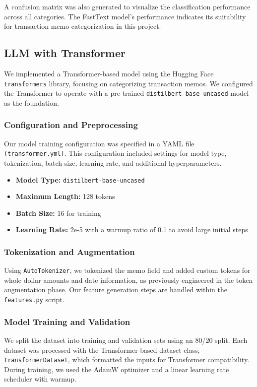 \documentclass[12pt,letterpaper]{article}
\begin{document}
A confusion matrix was also generated to visualize the classification performance across all categories. The FastText model's performance indicates its suitability for transaction memo categorization in this project.

\subsection{LLM with Transformer}
We implemented a Transformer-based model using the Hugging Face \texttt{transformers} library, focusing on categorizing transaction memos. We configured the Transformer to operate with a pre-trained \texttt{distilbert-base-uncased} model as the foundation.

\subsubsection{Configuration and Preprocessing}
Our model training configuration was specified in a YAML file \texttt{(transformer.yml)}. This configuration included settings for model type, tokenization, batch size, learning rate, and additional hyperparameters.

\begin{itemize}
    \item \textbf{Model Type:} \texttt{distilbert-base-uncased}
    \item \textbf{Maximum Length:} 128 tokens
    \item \textbf{Batch Size:} 16 for training
    \item \textbf{Learning Rate:} 2e-5 with a warmup ratio of 0.1 to avoid large initial steps
\end{itemize}

\subsubsection{Tokenization and Augmentation}
Using \texttt{AutoTokenizer}, we tokenized the memo field and added custom tokens for whole dollar amounts and date information, as previously engineered in the token augmentation phase. Our feature generation steps are handled within the \texttt{features.py} script.

\subsubsection{Model Training and Validation}
We split the dataset into training and validation sets using an 80/20 split. Each dataset was processed with the Transformer-based dataset class, \texttt{TransformerDataset}, which formatted the inputs for Transformer compatibility. During training, we used the AdamW optimizer and a linear learning rate scheduler with warmup.
\end{document}
